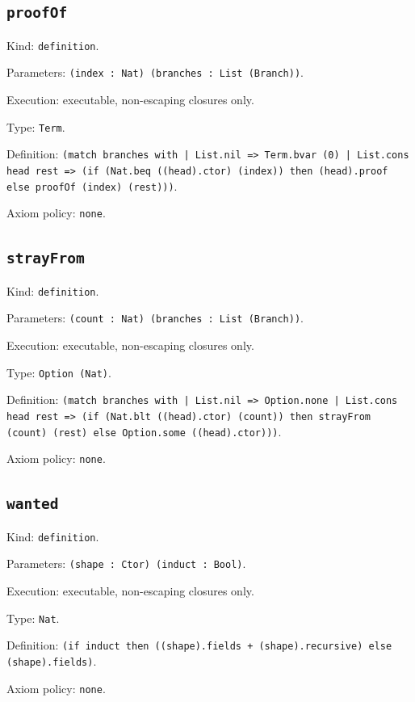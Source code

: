 \documentclass[11pt]{article}
\begin{document}
\subsection*{\texttt{proofOf}}
\noindent Kind: \texttt{definition}.\par
\noindent Parameters: \texttt{(index : Nat) (branches : List (Branch))}.\par
\noindent Execution: executable, non-escaping closures only.\par
\noindent Type: \texttt{Term}.\par
\noindent Definition: \texttt{(match branches with | List.nil => Term.bvar (0) | List.cons head rest => (if (Nat.beq ((head).ctor) (index)) then (head).proof else proofOf (index) (rest)))}.\par
\noindent Axiom policy: \texttt{none}.\par
\subsection*{\texttt{strayFrom}}
\noindent Kind: \texttt{definition}.\par
\noindent Parameters: \texttt{(count : Nat) (branches : List (Branch))}.\par
\noindent Execution: executable, non-escaping closures only.\par
\noindent Type: \texttt{Option (Nat)}.\par
\noindent Definition: \texttt{(match branches with | List.nil => Option.none | List.cons head rest => (if (Nat.blt ((head).ctor) (count)) then strayFrom (count) (rest) else Option.some ((head).ctor)))}.\par
\noindent Axiom policy: \texttt{none}.\par
\subsection*{\texttt{wanted}}
\noindent Kind: \texttt{definition}.\par
\noindent Parameters: \texttt{(shape : Ctor) (induct : Bool)}.\par
\noindent Execution: executable, non-escaping closures only.\par
\noindent Type: \texttt{Nat}.\par
\noindent Definition: \texttt{(if induct then ((shape).fields + (shape).recursive) else (shape).fields)}.\par
\noindent Axiom policy: \texttt{none}.\par
\end{document}
